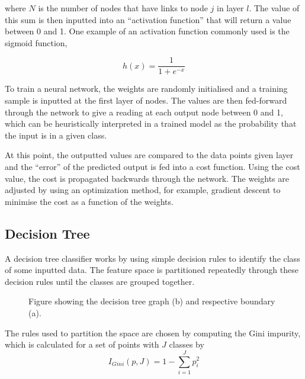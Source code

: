\documentclass[a4paper,11pt,twoside]{article}
\begin{document}
where $N$ is the number of nodes that have links to node $j$ in layer $l$. The value of this sum is then inputted into an “activation function” that will return a value between 0 and 1. One example of an activation function commonly used is the sigmoid function, 

\begin{equation}
h(x)=\frac{1}{1+e^{-x}}
\end{equation}

To train a neural network, the weights are randomly initialised and a training sample is inputted at the first layer of nodes. The values are then fed-forward through the network to give a reading at each output node between 0 and 1, which can be heuristically interpreted in a trained model as the probability that the input is in a given class. 
\newline

At this point, the outputted values are compared to the data points given layer and the “error” of the predicted output is fed into a cost function. Using the cost value, the cost is propagated backwards through the network.  The weights are adjusted by using an optimization method, for example, gradient descent to minimise the cost as a function of the weights.

\subsection{Decision Tree}

A decision tree classifier works by using simple decision rules to identify the class of some inputted data. The feature space is partitioned repeatedly through these decision rules until the classes are grouped together. 

\begin{figure}[h]
    \centering
    \qquad
    \caption{Figure showing the decision tree graph (b) and respective boundary (a).}%
    \label{fig:example}%
\end{figure}

The rules used to partition the space are chosen by computing the Gini impurity, which is calculated for a set of points with $J$ classes by
\begin{equation}
I_{Gini}(p, J)=1-\sum_{i=1}^Jp_i^2
\end{equation}
\end{document}
